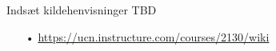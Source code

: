 Indsæt kildehenvisninger TBD
\begin{enumerate}
	\item[•] \url{https://ucn.instructure.com/courses/2130/wiki}
\end{enumerate}


